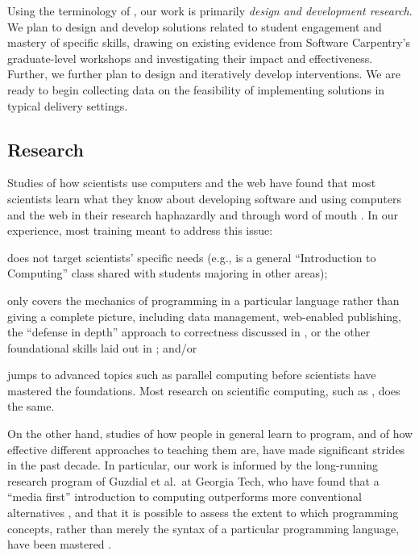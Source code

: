 \documentclass{proposalnsf}
\begin{document}
Using the terminology of \cite{guidelines}, our work is primarily
\emph{design and development research}. We plan to design and develop
solutions related to student engagement and mastery of specific
skills, drawing on existing evidence from Software Carpentry's
graduate-level workshops and investigating their impact and
effectiveness. Further, we further plan to design and iteratively
develop interventions. We are ready to begin collecting data on the
feasibility of implementing solutions in typical delivery settings.

\subsection{Research}

Studies of how scientists use computers and the web have found that
most scientists learn what they know about developing software and
using computers and the web in their research haphazardly and through
word of mouth \cite{hannay2009,prabhu2011}. In our experience, most
training meant to address this issue:

\begin{compactitem}

\item
  does not target scientists' specific needs (e.g., is a general
  ``Introduction to Computing'' class shared with students majoring in
  other areas);

\item
  only covers the mechanics of programming in a particular language
  rather than giving a complete picture, including data management,
  web-enabled publishing, the ``defense in depth'' approach to
  correctness discussed in \cite{dubois2005}, or the other
  foundational skills laid out in \cite{wilson2013}; and/or

\item
  jumps to advanced topics such as parallel computing before
  scientists have mastered the foundations.  Most research on
  scientific computing, such as \cite{hochstein2005}, does the same.

\end{compactitem}

On the other hand, studies of how people in general learn to program,
and of how effective different approaches to teaching them are, have
made significant strides in the past decade.  In particular, our work
is informed by the long-running research program of Guzdial et al.\ at
Georgia Tech, who have found that a ``media first'' introduction to
computing outperforms more conventional alternatives
\cite{guzdial2013}, and that it is possible to assess the extent to
which programming concepts, rather than merely the syntax of a
particular programming language, have been mastered \cite{tew2011}.
\end{document}
